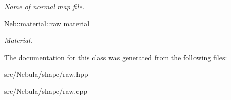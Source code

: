 \begin{DoxyCompactItemize}
\begin{DoxyCompactList}\small\item\em \-Name of normal map file. \end{DoxyCompactList}\item 
\hypertarget{classNeb_1_1Shape_1_1Raw_aae71583852d98c27b381ff0d5262d5fa}{\hyperlink{structNeb_1_1material_1_1raw}{\-Neb\-::material\-::raw} \hyperlink{classNeb_1_1Shape_1_1Raw_aae71583852d98c27b381ff0d5262d5fa}{material\-\_\-}}\label{classNeb_1_1Shape_1_1Raw_aae71583852d98c27b381ff0d5262d5fa}

\begin{DoxyCompactList}\small\item\em \-Material. \end{DoxyCompactList}\end{DoxyCompactItemize}


\-The documentation for this class was generated from the following files\-:\begin{DoxyCompactItemize}
\item 
src/\-Nebula/shape/raw.\-hpp\item 
src/\-Nebula/shape/raw.\-cpp\end{DoxyCompactItemize}
